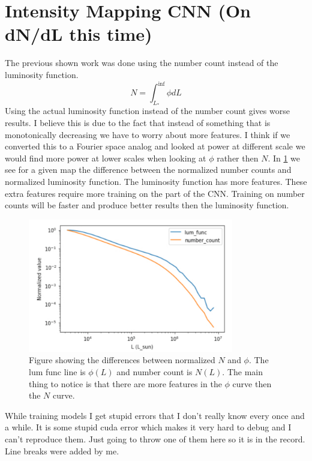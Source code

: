 \documentclass{article}
\begin{document}
	\section{Intensity Mapping CNN (On dN/dL this time)} \label{sec:cnn2}
		The previous shown work was done using the number count instead of the luminosity function.
		\begin{equation}
			N = \int_{L_*}^{\inf} \phi dL
		\end{equation}
		Using the actual luminosity function instead of the number count gives worse results.  I believe this is due to the fact that instead of something that is monotonically decreasing we have to worry about more features.  I think if we converted this to a Fourier space analog and looked at power at different scale we would find more power at lower scales when looking at \(\phi\) rather then \(N\).  In \cref{fig:compare_N_to_phi} we see for a given map the difference between the normalized number counts and normalized luminosity function.  The luminosity function has more features.  These extra features require more training on the part of the CNN.  Training on number counts will be faster and produce better results then the luminosity function.

		\begin{figure}[H]
			\centering
			\includegraphics[width=0.8\textwidth]{compare_N_to_phi.pdf}
			\caption{Figure showing the differences between normalized \(N\) and \(\phi\).  The lum func line is \(\phi(L)\) and number count is \(N(L)\).  The main thing to notice is that there are more features in the \(\phi\) curve then the \(N\) curve.}
			\label{fig:compare_N_to_phi}
		\end{figure}

		While training models I get stupid errors that I don't really know every once and a while.  It is some stupid cuda error which makes it very hard to debug and I can't reproduce them.  Just going to throw one of them here so it is in the record.  Line breaks were added by me.
\end{document}
